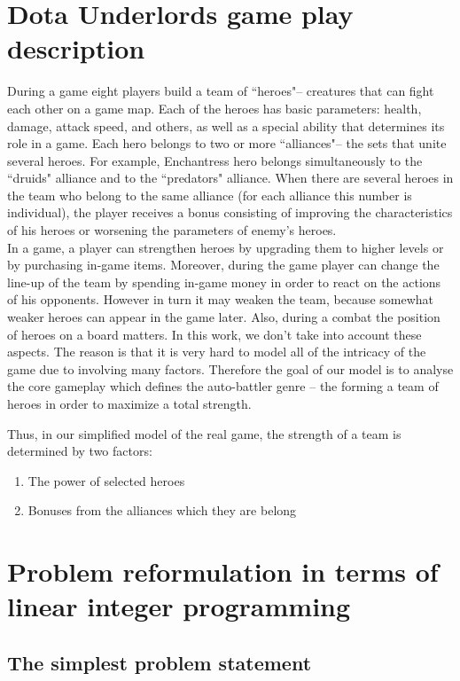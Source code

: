\documentclass[smallextended]{svjour3}       %
\begin{document}
\section{Dota Underlords game play description}
\label{SectionDUDescription}
During a game eight players build a team of ``heroes"-- creatures that can fight each other on a game map. Each of the heroes has basic parameters: health, damage, attack speed, and others, as well as a special ability that determines its role in a game. Each hero belongs to two or more ``alliances"-- the sets that unite several heroes. For example, Enchantress hero belongs simultaneously to the ``druids" alliance and to the ``predators" alliance. When there are several heroes in the team who belong to the same alliance (for each alliance this number is individual), the player receives a bonus consisting of improving the characteristics of his heroes or worsening the parameters of enemy's heroes.\\
In a game, a player can strengthen heroes by upgrading them to higher levels or by purchasing in-game items. Moreover, during the game player can change the line-up of the team by spending in-game money in order to react on the actions of his opponents. However in turn it may weaken the team, because somewhat weaker heroes can appear in the game later. Also, during a combat the position of heroes on a board matters. In this work, we don't take into account these aspects. The reason is that it is very hard to model all of the intricacy of the game due to involving many factors. Therefore the goal of our model is to analyse the core gameplay which defines the auto-battler genre -- the forming a team of heroes in order to maximize a total strength.

Thus, in our simplified model of the real game, the strength of a team is determined by two factors:
\begin{enumerate}
    \item The power of selected heroes
    \item Bonuses from the alliances which they are belong
\end{enumerate}


\section{Problem reformulation in terms of linear integer programming}
\label{SectionDUIP}

\subsection{The simplest problem statement}
\end{document}
